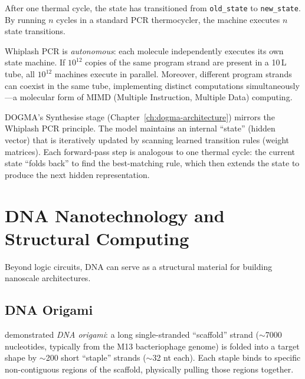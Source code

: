 After one thermal cycle, the state has transitioned from \texttt{old\_state} to \texttt{new\_state}.  By running $n$ cycles in a standard PCR thermocycler, the machine executes $n$ state transitions.

\begin{keyinsight}
Whiplash PCR is \emph{autonomous}: each molecule independently executes its own state machine.  If $10^{12}$ copies of the same program strand are present in a 10\,\textmu L tube, all $10^{12}$ machines execute in parallel.  Moreover, different program strands can coexist in the same tube, implementing distinct computations simultaneously---a molecular form of MIMD (Multiple Instruction, Multiple Data) computing.
\end{keyinsight}

\begin{implnote}
DOGMA's Synthesise stage (Chapter~\ref{ch:dogma-architecture}) mirrors the Whiplash PCR principle.  The model maintains an internal ``state'' (hidden vector) that is iteratively updated by scanning learned transition rules (weight matrices).  Each forward-pass step is analogous to one thermal cycle: the current state ``folds back'' to find the best-matching rule, which then extends the state to produce the next hidden representation.
\end{implnote}

\section{DNA Nanotechnology and Structural Computing}
\label{sec:dna-nanotech}

Beyond logic circuits, DNA can serve as a structural material for building nanoscale architectures.

\subsection{DNA Origami}

\citet{rothemund2006} demonstrated \emph{DNA origami}: a long single-stranded ``scaffold'' strand ($\sim$7000 nucleotides, typically from the M13 bacteriophage genome) is folded into a target shape by $\sim$200 short ``staple'' strands ($\sim$32 nt each). Each staple binds to specific non-contiguous regions of the scaffold, physically pulling those regions together.

